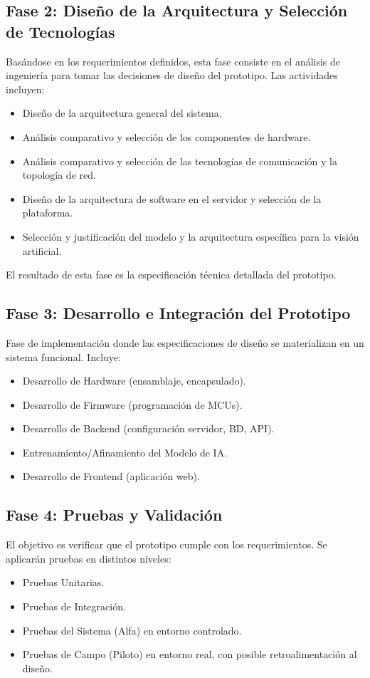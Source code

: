 \subsection{Fase 2: Diseño de la Arquitectura y Selección de Tecnologías} %
\label{subsec:met_fase2} %
Basándose en los requerimientos definidos, esta fase consiste en el análisis de ingeniería para tomar las decisiones de diseño del prototipo.
Las actividades incluyen:
\begin{itemize}
    \item Diseño de la arquitectura general del sistema.
    \item Análisis comparativo y selección de los componentes de hardware.
    \item Análisis comparativo y selección de las tecnologías de comunicación y la topología de red.
    \item Diseño de la arquitectura de software en el servidor y selección de la plataforma.
    \item Selección y justificación del modelo y la arquitectura específica para la visión artificial.
\end{itemize}
El resultado de esta fase es la especificación técnica detallada del prototipo.

\subsection{Fase 3: Desarrollo e Integración del Prototipo} %
\label{subsec:met_fase3} %
Fase de implementación donde las especificaciones de diseño se materializan en un sistema funcional. Incluye:
\begin{itemize}
    \item Desarrollo de Hardware (ensamblaje, encapsulado).
    \item Desarrollo de Firmware (programación de MCUs).
    \item Desarrollo de Backend (configuración servidor, BD, API).
    \item Entrenamiento/Afinamiento del Modelo de IA.
    \item Desarrollo de Frontend (aplicación web).
\end{itemize}

\subsection{Fase 4: Pruebas y Validación} %
\label{subsec:met_fase4} %
El objetivo es verificar que el prototipo cumple con los requerimientos. Se aplicarán pruebas en distintos niveles:
\begin{itemize}
    \item Pruebas Unitarias.
    \item Pruebas de Integración.
    \item Pruebas del Sistema (Alfa) en entorno controlado.
    \item Pruebas de Campo (Piloto) en entorno real, con posible retroalimentación al diseño.
\end{itemize}

